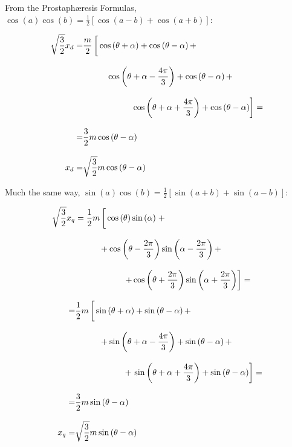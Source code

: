 	From the Prostaph\ae resis Formulas, $\cos\left(a\right)\cos\left(b\right) = \frac{1}{2}\left[\cos\left(a-b\right) + \cos\left(a+b\right)\right]$:

\begin{align}
\sqrt{\dfrac{3}{2}} x_d
	=& \dfrac{m}{2}\left[\raisebox{5mm}{} \cos\left(\theta + \alpha\right) + \cos\left(\theta - \alpha\right) + \right. \nonumber\\[3mm]
	&\hspace{1cm} \cos\left(\theta + \alpha - \dfrac{4\pi}{3}\right) + \cos\left(\theta - \alpha\right) + \nonumber\\[3mm]
	&\hspace{2cm} \left. \cos\left(\theta + \alpha + \dfrac{4\pi}{3}\right) + \cos\left(\theta - \alpha\right)\right] = \nonumber\\[3mm]
	=& \dfrac{3}{2} m\cos\left(\theta - \alpha\right) \nonumber\\[3mm]
	x_d =& \sqrt{\dfrac{3}{2}}m\cos\left(\theta - \alpha\right)
\end{align}

	Much the same way, $\sin\left(a\right)\cos\left(b\right) = \frac{1}{2}\left[\sin\left(a+b\right) + \sin\left(a-b\right)\right]$:

\begin{align}
\sqrt{\dfrac{3}{2}}x_q &= \dfrac{1}{2}m \left[\raisebox{5mm}{} \cos\left(\theta\right)\sin\left(\alpha\right) \right.+ \nonumber\\[3mm]
	&\hspace{1cm} + \cos\left(\theta - \dfrac{2\pi}{3}\right)\sin\left(\alpha - \dfrac{2\pi}{3}\right) + \nonumber\\[3mm]
	&\hspace{2cm}\left. +\cos\left(\theta + \dfrac{2\pi}{3}\right)\sin\left(\alpha + \dfrac{2\pi}{3}\right)\right] =\nonumber\\[3mm]
	=& \dfrac{1}{2}m\left[\raisebox{5mm}{} \sin\left(\theta + \alpha\right) + \sin\left(\theta - \alpha\right) + \right.\nonumber\\[3mm]
	&\hspace{1cm} + \sin\left(\theta + \alpha - \dfrac{4\pi}{3}\right) + \sin\left(\theta - \alpha\right) + \nonumber\\[3mm]
	&\hspace{2cm} + \left. \sin\left(\theta + \alpha + \dfrac{4\pi}{3}\right) + \sin\left(\theta - \alpha\right) \right] = \nonumber\\[3mm]
	=& \dfrac{3}{2} m\sin\left(\theta - \alpha\right) \nonumber\\[3mm]
	x_q =& \sqrt{\dfrac{3}{2}}m\sin\left(\theta - \alpha\right)
\end{align}

